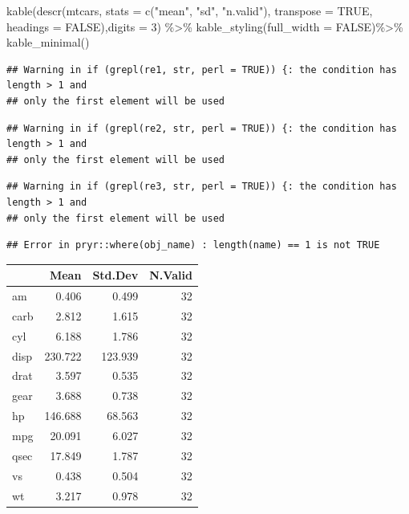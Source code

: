 \documentclass[
]{article}
\newenvironment{Shaded}{\begin{snugshade}}{\end{snugshade}}
\newcommand{\AttributeTok}[1]{\textcolor[rgb]{0.77,0.63,0.00}{#1}}
\newcommand{\ConstantTok}[1]{\textcolor[rgb]{0.00,0.00,0.00}{#1}}
\newcommand{\DecValTok}[1]{\textcolor[rgb]{0.00,0.00,0.81}{#1}}
\newcommand{\FunctionTok}[1]{\textcolor[rgb]{0.00,0.00,0.00}{#1}}
\newcommand{\NormalTok}[1]{#1}
\newcommand{\SpecialCharTok}[1]{\textcolor[rgb]{0.00,0.00,0.00}{#1}}
\newcommand{\StringTok}[1]{\textcolor[rgb]{0.31,0.60,0.02}{#1}}
\begin{document}
\begin{Shaded}
\begin{Highlighting}[]
\FunctionTok{kable}\NormalTok{(}\FunctionTok{descr}\NormalTok{(mtcars, }\AttributeTok{stats =} \FunctionTok{c}\NormalTok{(}\StringTok{"mean"}\NormalTok{, }\StringTok{"sd"}\NormalTok{, }\StringTok{"n.valid"}\NormalTok{), }\AttributeTok{transpose =} \ConstantTok{TRUE}\NormalTok{,}
              \AttributeTok{headings =} \ConstantTok{FALSE}\NormalTok{),}\AttributeTok{digits =} \DecValTok{3}\NormalTok{) }\SpecialCharTok{\%\textgreater{}\%} 
  \FunctionTok{kable\_styling}\NormalTok{(}\AttributeTok{full\_width =} \ConstantTok{FALSE}\NormalTok{)}\SpecialCharTok{\%\textgreater{}\%} \FunctionTok{kable\_minimal}\NormalTok{()}
\end{Highlighting}
\end{Shaded}

\begin{verbatim}
## Warning in if (grepl(re1, str, perl = TRUE)) {: the condition has length > 1 and
## only the first element will be used
\end{verbatim}

\begin{verbatim}
## Warning in if (grepl(re2, str, perl = TRUE)) {: the condition has length > 1 and
## only the first element will be used
\end{verbatim}

\begin{verbatim}
## Warning in if (grepl(re3, str, perl = TRUE)) {: the condition has length > 1 and
## only the first element will be used
\end{verbatim}

\begin{verbatim}
## Error in pryr::where(obj_name) : length(name) == 1 is not TRUE
\end{verbatim}

\begin{table}
\centering
\begin{tabular}{l|r|r|r}
\hline
  & Mean & Std.Dev & N.Valid\\
\hline
am & 0.406 & 0.499 & 32\\
\hline
carb & 2.812 & 1.615 & 32\\
\hline
cyl & 6.188 & 1.786 & 32\\
\hline
disp & 230.722 & 123.939 & 32\\
\hline
drat & 3.597 & 0.535 & 32\\
\hline
gear & 3.688 & 0.738 & 32\\
\hline
hp & 146.688 & 68.563 & 32\\
\hline
mpg & 20.091 & 6.027 & 32\\
\hline
qsec & 17.849 & 1.787 & 32\\
\hline
vs & 0.438 & 0.504 & 32\\
\hline
wt & 3.217 & 0.978 & 32\\
\hline
\end{tabular}
\end{table}
\end{document}
